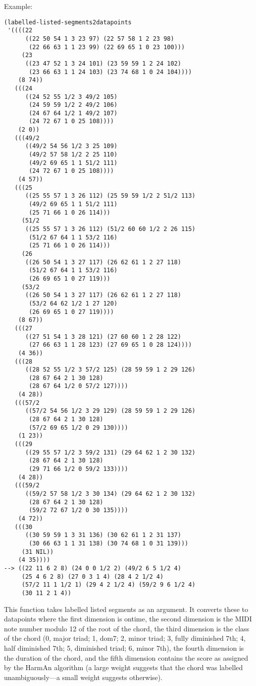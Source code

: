 \vspace{0.5cm}
\noindent Example:
\begin{verbatim}
(labelled-listed-segments2datapoints
 '((((22
      ((22 50 54 1 3 23 97) (22 57 58 1 2 23 98)
       (22 66 63 1 1 23 99) (22 69 65 1 0 23 100)))
     (23
      ((23 47 52 1 3 24 101) (23 59 59 1 2 24 102)
       (23 66 63 1 1 24 103) (23 74 68 1 0 24 104))))
    (8 74))
   (((24
      ((24 52 55 1/2 3 49/2 105)
       (24 59 59 1/2 2 49/2 106)
       (24 67 64 1/2 1 49/2 107)
       (24 72 67 1 0 25 108))))
    (2 0))
   (((49/2
      ((49/2 54 56 1/2 3 25 109)
       (49/2 57 58 1/2 2 25 110)
       (49/2 69 65 1 1 51/2 111)
       (24 72 67 1 0 25 108))))
    (4 57))
   (((25
      ((25 55 57 1 3 26 112) (25 59 59 1/2 2 51/2 113)
       (49/2 69 65 1 1 51/2 111)
       (25 71 66 1 0 26 114)))
     (51/2
      ((25 55 57 1 3 26 112) (51/2 60 60 1/2 2 26 115)
       (51/2 67 64 1 1 53/2 116)
       (25 71 66 1 0 26 114)))
     (26
      ((26 50 54 1 3 27 117) (26 62 61 1 2 27 118)
       (51/2 67 64 1 1 53/2 116)
       (26 69 65 1 0 27 119)))
     (53/2
      ((26 50 54 1 3 27 117) (26 62 61 1 2 27 118)
       (53/2 64 62 1/2 1 27 120)
       (26 69 65 1 0 27 119))))
    (8 67))
   (((27
      ((27 51 54 1 3 28 121) (27 60 60 1 2 28 122)
       (27 66 63 1 1 28 123) (27 69 65 1 0 28 124))))
    (4 36))
   (((28
      ((28 52 55 1/2 3 57/2 125) (28 59 59 1 2 29 126)
       (28 67 64 2 1 30 128)
       (28 67 64 1/2 0 57/2 127))))
    (4 28))
   (((57/2
      ((57/2 54 56 1/2 3 29 129) (28 59 59 1 2 29 126)
       (28 67 64 2 1 30 128)
       (57/2 69 65 1/2 0 29 130))))
    (1 23))
   (((29
      ((29 55 57 1/2 3 59/2 131) (29 64 62 1 2 30 132)
       (28 67 64 2 1 30 128)
       (29 71 66 1/2 0 59/2 133))))
    (4 28))
   (((59/2
      ((59/2 57 58 1/2 3 30 134) (29 64 62 1 2 30 132)
       (28 67 64 2 1 30 128)
       (59/2 72 67 1/2 0 30 135))))
    (4 72))
   (((30
      ((30 59 59 1 3 31 136) (30 62 61 1 2 31 137)
       (30 66 63 1 1 31 138) (30 74 68 1 0 31 139)))
     (31 NIL))
    (4 35))))
--> ((22 11 6 2 8) (24 0 0 1/2 2) (49/2 6 5 1/2 4)
     (25 4 6 2 8) (27 0 3 1 4) (28 4 2 1/2 4)
     (57/2 11 1 1/2 1) (29 4 2 1/2 4) (59/2 9 6 1/2 4)
     (30 11 2 1 4))
\end{verbatim}

\noindent This function takes labelled listed
segments as an argument. It converts these to
datapoints where the first dimension is ontime, the
second dimension is the MIDI note number modulo 12 of
the root of the chord, the third dimension is the
class of the chord (0, major triad; 1, dom7; 2, minor
triad; 3, fully diminished 7th; 4, half diminished
7th; 5, diminished triad; 6, minor 7th), the fourth
dimension is the duration of the chord, and the
fifth dimension contains the score as assigned by the
HarmAn algorithm (a large weight suggests that the
chord was labelled unambiguously---a small weight
suggests otherwise).


